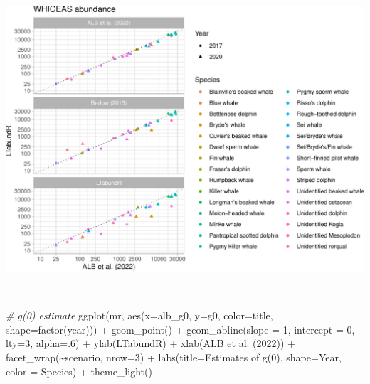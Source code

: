 \documentclass[
]{book}
\newenvironment{Shaded}{\begin{snugshade}}{\end{snugshade}}
\newcommand{\AttributeTok}[1]{\textcolor[rgb]{0.77,0.63,0.00}{#1}}
\newcommand{\CommentTok}[1]{\textcolor[rgb]{0.56,0.35,0.01}{\textit{#1}}}
\newcommand{\DecValTok}[1]{\textcolor[rgb]{0.00,0.00,0.81}{#1}}
\newcommand{\FunctionTok}[1]{\textcolor[rgb]{0.00,0.00,0.00}{#1}}
\newcommand{\NormalTok}[1]{#1}
\newcommand{\SpecialCharTok}[1]{\textcolor[rgb]{0.00,0.00,0.00}{#1}}
\newcommand{\StringTok}[1]{\textcolor[rgb]{0.31,0.60,0.02}{#1}}
\begin{document}
\includegraphics{figures/unnamed-chunk-384-1.pdf}

~

\begin{Shaded}
\begin{Highlighting}[]
\CommentTok{\# g(0) estimate}
\FunctionTok{ggplot}\NormalTok{(mr,}
       \FunctionTok{aes}\NormalTok{(}\AttributeTok{x=}\NormalTok{alb\_g0, }\AttributeTok{y=}\NormalTok{g0, }
           \AttributeTok{color=}\NormalTok{title, }\AttributeTok{shape=}\FunctionTok{factor}\NormalTok{(year))) }\SpecialCharTok{+}
    \FunctionTok{geom\_point}\NormalTok{() }\SpecialCharTok{+}
    \FunctionTok{geom\_abline}\NormalTok{(}\AttributeTok{slope =} \DecValTok{1}\NormalTok{, }\AttributeTok{intercept =} \DecValTok{0}\NormalTok{, }\AttributeTok{lty=}\DecValTok{3}\NormalTok{, }\AttributeTok{alpha=}\NormalTok{.}\DecValTok{6}\NormalTok{) }\SpecialCharTok{+}
    \FunctionTok{ylab}\NormalTok{(}\StringTok{\textquotesingle{}LTabundR\textquotesingle{}}\NormalTok{) }\SpecialCharTok{+} \FunctionTok{xlab}\NormalTok{(}\StringTok{\textquotesingle{}ALB et al. (2022)\textquotesingle{}}\NormalTok{) }\SpecialCharTok{+}
  \FunctionTok{facet\_wrap}\NormalTok{(}\SpecialCharTok{\textasciitilde{}}\NormalTok{scenario, }\AttributeTok{nrow=}\DecValTok{3}\NormalTok{) }\SpecialCharTok{+} 
  \FunctionTok{labs}\NormalTok{(}\AttributeTok{title=}\StringTok{\textquotesingle{}Estimates of g(0)\textquotesingle{}}\NormalTok{, }
       \AttributeTok{shape=}\StringTok{\textquotesingle{}Year\textquotesingle{}}\NormalTok{, }\AttributeTok{color =} \StringTok{\textquotesingle{}Species\textquotesingle{}}\NormalTok{) }\SpecialCharTok{+} 
  \FunctionTok{theme\_light}\NormalTok{()}
\end{Highlighting}
\end{Shaded}
\end{document}
